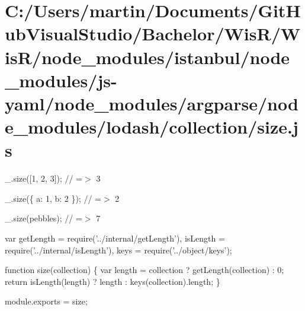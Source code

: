 \hypertarget{_c_1_2_users_2martin_2_documents_2_git_hub_visual_studio_2_bachelor_2_wis_r_2_wis_r_2node_module822b491b7fc78c7a5ad6e294db8bef44}{}\section{C\+:/\+Users/martin/\+Documents/\+Git\+Hub\+Visual\+Studio/\+Bachelor/\+Wis\+R/\+Wis\+R/node\+\_\+modules/istanbul/node\+\_\+modules/js-\/yaml/node\+\_\+modules/argparse/node\+\_\+modules/lodash/collection/size.\+js}
\+\_\+.\+size(\mbox{[}1, 2, 3\mbox{]}); // =$>$ 3

\+\_\+.\+size(\{ \textquotesingle{}a\textquotesingle{}\+: 1, \textquotesingle{}b\textquotesingle{}\+: 2 \}); // =$>$ 2

\+\_\+.\+size(\textquotesingle{}pebbles\textquotesingle{}); // =$>$ 7


\begin{DoxyCodeInclude}
var getLength = require(\textcolor{stringliteral}{'../internal/getLength'}),
    isLength = require(\textcolor{stringliteral}{'../internal/isLength'}),
    keys = require(\textcolor{stringliteral}{'../object/keys'});

\textcolor{keyword}{function} size(collection) \{
  var length = collection ? getLength(collection) : 0;
  \textcolor{keywordflow}{return} isLength(length) ? length : keys(collection).length;
\}

module.exports = size;
\end{DoxyCodeInclude}
 